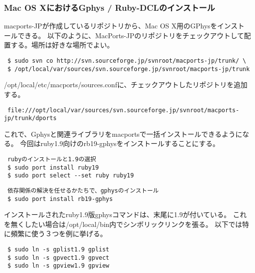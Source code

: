\subsubsection{Mac OS XにおけるGphys / Ruby-DCLのインストール}

macports-JPが作成しているリポジトリから、Mac OS X用のGPhysをインストールできる。
以下のように、MacPorts-JPのリポジトリをチェックアウトして配置する。場所は好きな場所でよい。
\begin{verbatim}
 $ sudo svn co http://svn.sourceforge.jp/svnroot/macports-jp/trunk/ \
 $ /opt/local/var/sources/svn.sourceforge.jp/svnroot/macports-jp/trunk
\end{verbatim}
/opt/local/etc/macports/sources.confに、チェックアウトしたリポジトリを追加する。
\begin{verbatim}
 file:///opt/local/var/sources/svn.sourceforge.jp/svnroot/macports-jp/trunk/dports
\end{verbatim}
これで、Gphysと関連ライブラリをmacportsで一括インストールできるようになる。
今回はruby1.9向けのrb19-gphysをインストールすることにする。

\begin{verbatim}
 rubyのインストールと1.9の選択
 $ sudo port install ruby19
 $ sudo port select --set ruby ruby19
\end{verbatim}
\begin{verbatim}
 依存関係の解決を任せるかたちで、gphysのインストール
 $ sudo port install rb19-gphys
\end{verbatim}

インストールされたruby1.9版gphysコマンドは、末尾に1.9が付いている。
これを無くしたい場合は/opt/local/bin内でシンボリックリンクを張る。
以下では特に頻繁に使う３つを例に挙げる。
\begin{verbatim}
 $ sudo ln -s gplist1.9 gplist
 $ sudo ln -s gpvect1.9 gpvect
 $ sudo ln -s gpview1.9 gpview
\end{verbatim}



